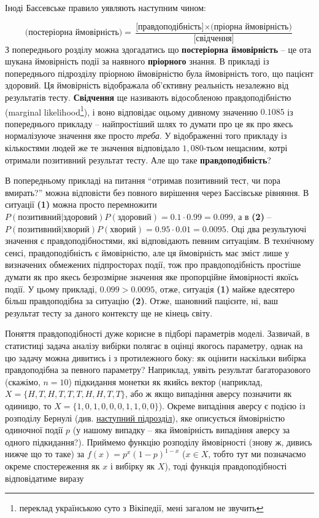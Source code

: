 \documentclass[
  11pt,
]{book}
\begin{document}
Іноді Баєсевське правило уявляють наступним чином:

\[\text{(постеріорна ймовірність)} = \frac{\text{[правдоподібність]} \times \text{(пріорна ймовірність)}}{\text{[свідчення]}}\]
З попереднього розділу можна здогадатись що \textbf{постеріорна
ймовірність} -- це ота шукана ймовірність події за наявного
\textbf{пріорного} знання. В прикладі із попереднього підрозділу
пріорною ймовірністю була ймовірність того, що пацієнт здоровий. Ця
ймовірність відображала об'єктивну реальність незалежно від результатів
тесту. \textbf{Свідчення} ще називають відособленою правдоподібністю
(marginal likelihood\footnote{переклад українською суто з Вікіпедії,
  мені загалом не звучить}), і воно відповідає оцьому дивному значенню
\(0.1085\) із попереднього прикладу -- найпростіший шлях то думати про
це як про якесь нормалізуюче значення яке просто \emph{треба}. У
відображенні того прикладу із кількостями людей же те значення
відповідало \(1,080\)-тьом нещасним, котрі отримали позитивний результат
тесту. Але що таке \textbf{правдоподібність}?

В попередньому прикладі на питання ``отримав позитивний тест, чи пора
вмирать?'' можна відповісти без повного вирішення через Баєсівське
рівняння. В ситуації \textbf{(1)} можна просто перемножити
\(P(\text{позитивний|здоровий})P(\text{здоровий}) = 0.1 \cdot 0.99 = 0.099\),
а в \textbf{(2)} --
\(P(\text{позитивний|хворий})P(\text{хворий}) = 0.95 \cdot 0.01 = 0.0095\).
Оці два результуючі значення є правдоподібностями, які відповідають
певним ситуаціям. В технічному сенсі, правдоподібність є ймовірністю,
але ця ймовірність має зміст лише у визначених обмежених підпросторах
події, тож про правдоподібність простіше думати як про якесь безрозмірне
значення яке пропорційне ймовірності якоїсь події. У цьому прикладі,
\(0.099 > 0.0095\), отже, ситуація \textbf{(1)} майже вдесятеро більш
правдоподібна за ситуацію \textbf{(2)}. Отже, шановний пацієнте, ні, ваш
результат тесту за даного контексту ще не кінець світу.

Поняття правдоподібності дуже корисне в підборі параметрів моделі.
Зазвичай, в статистиці задача аналізу вибірки полягає в оцінці якогось
параметру, однак на цю задачу можна дивитись і з протилежного боку: як
оцінити наскільки вибірка правдоподібна за певного параметру? Наприклад,
уявіть результат багаторазового (скажімо, \(n = 10\)) підкидання монетки
як якийсь вектор (наприклад, \(X = \{H, T, H, T, T, T, H, H, T, T\}\),
або ж якщо випадіння аверсу позначити як одиницю, то
\(X = \{1, 0, 1, 0, 0, 0, 1, 1, 0, 0\}\)). Окреме випадіння аверсу є
подією із розподілу Бернулі (див. \hyperref[pdfs]{наступний підрозділ}),
яке описується ймовірністю одиночної події \(p\) (у нашому випадку --
яка ймовірність випадіння аверсу за одного підкидання?). Приймемо
функцію розподілу ймовірності (знову ж, дивись нижче що то таке) за
\(f(x) = p^x (1-p)^{1-x}\) (\(x \in X\), тобто тут ми позначаємо окреме
спостереження як \(x\) і вибірку як \(X\)), тоді функція
правдоподібності відповідатиме виразу
\end{document}
